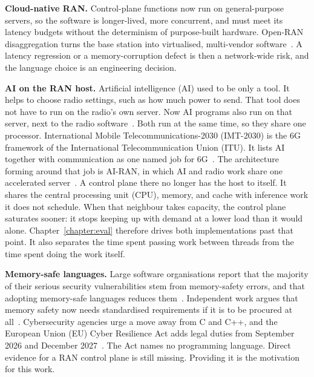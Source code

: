\documentclass[english,oneside,a4paper,censored,csm,software-track-2020]{HYthesisML}
\begin{document}
\begin{compactitem}
\item \textbf{Cloud-native RAN.} Control-plane functions now run on general-purpose
servers, so the software is longer-lived, more concurrent, and must meet
its latency budgets without the determinism of purpose-built hardware.
Open-RAN disaggregation turns the base station into virtualised,
multi-vendor software~\cite{polese2023oran}. A latency regression or a
memory-corruption defect is then a network-wide risk, and the language
choice is an engineering decision.

\item \textbf{AI on the RAN host.} Artificial intelligence (AI) used to be only a tool.
It helps to choose radio settings, such as how much power to send. That tool does
not have to run on the radio's own server. Now AI programs also run on that
server, next to the radio software~\cite{polese2026airan}. Both run at the same
time, so they share one processor. International Mobile
Telecommunications-2030 (IMT-2030) is the 6G framework of the
International Telecommunication Union (ITU). It lists AI together with
communication as one named job for 6G~\cite{itu2023imt2030}. The architecture
forming around that job is AI-RAN, in which AI and radio work share one
accelerated server~\cite{airan2026orchestrator}. A control plane there
no longer has the host to itself. It shares the central processing unit
(CPU), memory, and cache with inference work it does not schedule. When
that neighbour takes capacity, the control plane saturates sooner: it
stops keeping up with demand at a lower load than it would alone.
Chapter~\ref{chapter:eval} therefore drives both implementations past that point.
It also separates the time spent passing work between threads from the time
spent doing the work itself.

\item \textbf{Memory-safe languages.} Large software organisations report that the
majority of their serious security vulnerabilities stem from memory-safety errors,
and that adopting memory-safe languages reduces
them~\cite{msrc2019memory,google2022android,vanderstoep2025android,google2024securebydesign}.
Independent work argues that memory safety now needs standardised
requirements if it is to be procured at
all~\cite{watson2025memorysafety}. Cybersecurity agencies urge a move
away from C and C++, and the European Union (EU) Cyber Resilience Act
adds legal duties from September 2026 and December
2027~\cite{cisa2023memorysafe,oncd2024building,eu2024cra}. The Act names
no programming language. Direct evidence for a RAN control plane is
still missing. Providing it is the motivation for this work.
\end{compactitem}
\end{document}
